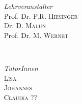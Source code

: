 \begin{titlepage}
\vfill

	\begin{minipage}{0.45\textwidth}
		\begin{flushleft}
			\large
			\textit{Lehrveranstalter}\\
			Prof. Dr. P.R. \textsc{Hiesinger}\\ 
			Dr. D. \textsc{Malun}\\ 
			Prof. Dr. M. \textsc{Wernet}
		\end{flushleft}
	\end{minipage}
	~
		\begin{minipage}{0.45\textwidth}
		\begin{flushright}
			
		\end{flushright}
	\end{minipage}
\vfill
	\begin{minipage}{0.45\textwidth}
		\begin{flushleft}
			\large
			\textit{TutorInnen}\\
			\textsc{Lisa}\\
			\textsc{Johannes}\\
			\textsc{Claudia ??}
		\end{flushleft}
	\end{minipage}
	~
		\begin{minipage}{0.45\textwidth}
		\begin{flushright}
			
		\end{flushright}
	\end{minipage}

	
	
	\vfill\vfill\vfill %
	
	
	
	 
	
	\vfill %
	
\end{titlepage}

